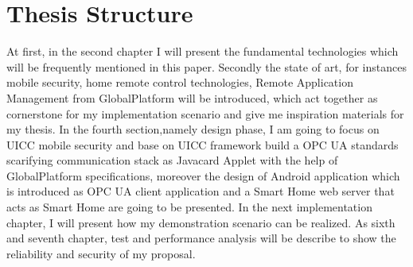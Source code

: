 \section{Thesis Structure}
At first, in the second chapter I will present the fundamental technologies which will be frequently mentioned in this paper. Secondly the state of art, for instances mobile security,  home remote control technologies, Remote Application Management from GlobalPlatform will be introduced, which act together as cornerstone for my implementation scenario and give me inspiration materials for my thesis. In the fourth section,namely design phase, I am going to focus on UICC mobile security and base on UICC framework build a OPC UA standards scarifying communication stack as Javacard Applet with the help of GlobalPlatform  specifications, moreover the design of Android application which is introduced as OPC UA client application and a Smart Home web server that acts as Smart Home are going to be presented. In the next implementation chapter, I will present how my demonstration scenario can be realized. As sixth and seventh chapter,  test and performance analysis will be describe to show the reliability and security of my proposal.
